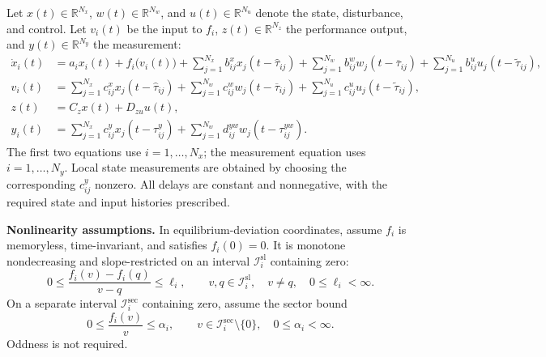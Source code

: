 ﻿\documentclass[11pt,a4paper]{article}
\begin{document}
Let $x(t)\in\mathbb R^{N_x}$, $w(t)\in\mathbb R^{N_w}$, and
$u(t)\in\mathbb R^{N_u}$ denote the state, disturbance, and control.
Let $v_i(t)$ be the input to $f_i$, $z(t)\in\mathbb R^{N_z}$ the
performance output, and $y(t)\in\mathbb R^{N_y}$ the measurement:
\begin{align*}
\dot{x}_i(t)
 &= a_i x_i(t) + f_i\bigl(v_i(t)\bigr)
    + \sum_{j=1}^{N_x} b^{x}_{ij}x_j(t-\hat{\tau}_{ij}) + \sum_{j=1}^{N_w} b^{w}_{ij}w_j(t-\overline{\tau}_{ij})
         + \sum_{j=1}^{N_u} b^{u}_{ij}u_j(t-\tilde{\tau}_{ij}),\\
v_i(t)
 &= \sum_{j=1}^{N_x} c^{x}_{ij}x_j(t-\hat{\tau}_{ij})
    + \sum_{j=1}^{N_w} c^{w}_{ij}w_j(t-\overline{\tau}_{ij})+ \sum_{j=1}^{N_u} c^{u}_{ij}u_j(t-\tilde{\tau}_{ij}),\\
z(t) &= C_zx(t) + D_{zu}u(t),\\
y_i(t) &= \sum_{j=1}^{N_x} c^{y}_{ij}x_j(t-\tau^{y}_{ij})
          + \sum_{j=1}^{N_w} d^{yw}_{ij}w_j(t-\tau^{yw}_{ij}).
\end{align*}
The first two equations use $i=1,\ldots,N_x$; the measurement equation
uses $i=1,\ldots,N_y$. Local state measurements are obtained by choosing
the corresponding $c^y_{ij}$ nonzero. All delays are constant and
nonnegative, with the required state and input histories prescribed.

\textbf{Nonlinearity assumptions.}
In equilibrium-deviation coordinates, assume $f_i$ is memoryless,
time-invariant, and satisfies $f_i(0)=0$. It is monotone nondecreasing
and slope-restricted on an interval $\mathcal I_i^{\mathrm{sl}}$ containing zero:
\begin{equation*}
0\leq\frac{f_i(v)-f_i(q)}{v-q}\leq\ell_i,
\qquad v,q\in\mathcal I_i^{\mathrm{sl}},\quad v\neq q,\quad 0\leq\ell_i<\infty.
\end{equation*}
On a separate interval $\mathcal I_i^{\mathrm{sec}}$ containing zero,
assume the sector bound
\begin{equation*}
0\leq\frac{f_i(v)}{v}\leq\alpha_i,
\qquad v\in\mathcal I_i^{\mathrm{sec}}\setminus\{0\},\quad 0\leq\alpha_i<\infty.
\end{equation*}
Oddness is not required.
\end{document}

